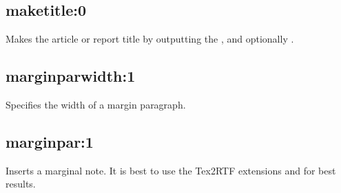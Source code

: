 \subsection*{maketitle:0}\label{maketitle}

Makes the article or report title by outputting the ,
\rtfsp{} and optionally .


\subsection*{marginparwidth:1}\label{marginparwidth}

Specifies the width of a margin paragraph.

\subsection*{marginpar:1}\label{marginpar}

Inserts a marginal note. It is best to use the Tex2RTF extensions \rtfsp
{} and  \rtfsp
for best results.

